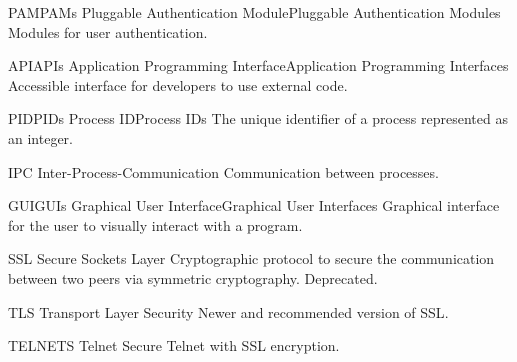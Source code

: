 %
{PAM}{PAMs}%
{Pluggable Authentication Module}{Pluggable Authentication Modules}%
{Modules for user authentication.}

%
{API}{APIs}%
{Application Programming Interface}{Application Programming Interfaces}%
{Accessible interface for developers to use external code.}

%
{PID}{PIDs}%
{Process ID}{Process IDs}%
{The unique identifier of a process represented as an integer.}

%
{IPC}{}%
{Inter-Process-Communication}{}%
{Communication between processes.}

%
{GUI}{GUIs}%
{Graphical User Interface}{Graphical User Interfaces}%
{Graphical interface for the user to visually interact with a program.}

%
{SSL}{}%
{Secure Sockets Layer}{}%
{Cryptographic protocol to secure the communication between two peers via symmetric cryptography. Deprecated.}

%
{TLS}{}%
{Transport Layer Security}{}%
{Newer and recommended version of \gls{SSL}.}

%
{TELNETS}{}%
{Telnet Secure}{}%
{Telnet with \gls{SSL} encryption.}


